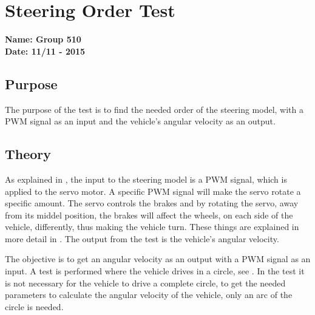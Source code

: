 \pagebreak
\section{Steering Order Test} %
\textbf{Name: Group 510}\\
\textbf{Date: 11/11 - 2015}

\subsection{Purpose}
The purpose of the test is to find the needed order of the steering model, with a PWM signal as an input and the vehicle's angular velocity as an output.

\subsection{Theory}
As explained in , the input to the steering model is a PWM signal, which is applied to the servo motor. A specific PWM signal will make the servo rotate a specific amount. The servo controls the brakes and by rotating the servo, away from its middel position, the brakes will affect the wheels, on each side of the vehicle, differently, thus making the vehicle turn. These things are explained in more detail in . The output from the test is the vehicle's angular velocity.

The objective is to get an angular velocity as an output with a PWM signal as an input. A test is performed where the vehicle drives in a circle, see . In the test it is not necessary for the vehicle to drive a complete circle, to get the needed parameters to calculate the angular velocity of the vehicle, only an arc of the circle is needed.

